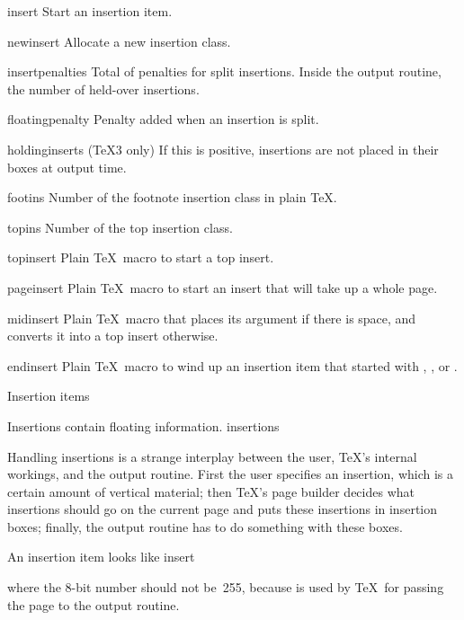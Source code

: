 \invent
\item insert 
      Start an insertion item.

\item newinsert 
      Allocate a new insertion class. 

\item insertpenalties 
      Total of penalties for split insertions.
      Inside the output routine, the number of held-over insertions.

\item floatingpenalty 
      Penalty added when an insertion is split.

\item holdinginserts
      (\TeX3 only)
      If this is positive, insertions are not placed in their boxes 
      at output time.

\item footins
      Number of the footnote insertion class in plain \TeX.

\item topins
      Number of the top insertion class.

\item topinsert
      Plain \TeX\ macro to start a top insert.

\item pageinsert
      Plain \TeX\ macro to start an insert that will take
      up a whole page.

\item midinsert
      Plain \TeX\ macro that places its argument if there is space,
      and converts it into a top insert otherwise.

\item endinsert
      Plain \TeX\ macro to wind up an insertion item
      that started with , ,
      or .

\inventstop


\point Insertion items

Insertions contain floating information.
\term insertions\par
Handling insertions is a strange interplay between the
user, \TeX's internal workings, and the output routine.
First the user specifies an insertion, which is
a certain amount of vertical material; 
then \TeX's page builder decides what insertions should go
on the current page and puts these insertions in insertion boxes;
finally, the output routine has to do something with these boxes.

An insertion item looks like
\csterm insert\par
\disp{}\lb{}\rb
\dispstop where the 8-bit number should not be~255,
because  is used by \TeX\ for passing the page to the output
routine.

